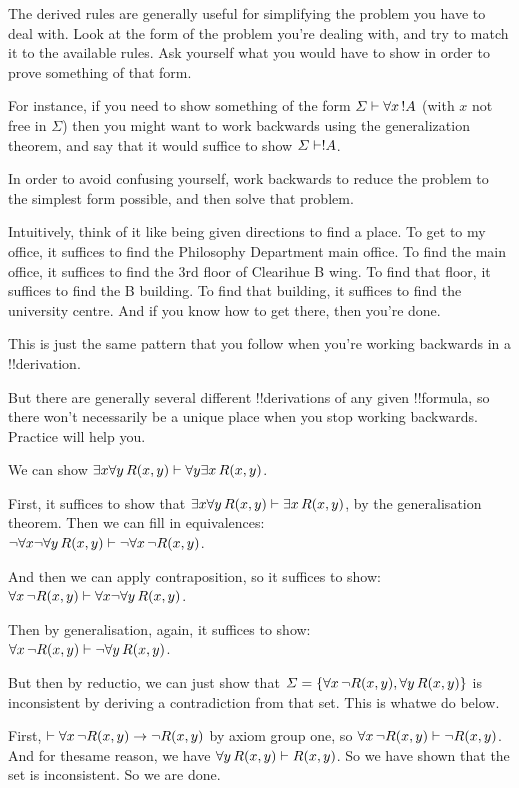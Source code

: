 \documentclass[../../../include/open-logic-section]{subfiles}
\begin{document}

\begin{explain}

    The derived rules are generally useful for simplifying the problem
    you have to deal with. Look at the form of the problem you're dealing
with, and try to match it to the available rules. Ask yourself what you
would have to show in order to prove something of that form.

    For instance, if you need to show something of the form $\Sigma
\Proves \lforall[x][!A]$ (with $x$ not free in $\Sigma$) then you might
want to work backwards using the generalization theorem, and say that
    it would suffice to show $\Sigma \Proves !A$.

    In order to avoid confusing yourself, work backwards to reduce the
    problem to the simplest form possible, and then solve that problem.

    Intuitively, think of it like being given directions to find a place.
To get to my office, it suffices to find the Philosophy Department main
office. To find the main office, it suffices to find the 3rd floor of
    Clearihue B wing. To find that floor, it suffices to find the B
    building. To find that building, it suffices to find the university
    centre. And if you know how to get there, then you're done.

    This is just the same pattern that you follow when you're working
    backwards in a !!{derivation}.

    But there are generally several different !!{derivation}s of any given
    !!{formula}, so there won't necessarily be a unique place when you stop
    working backwards. Practice will help you.
\end{explain}

\begin{ex}
We can show $\lexists[x]\lforall[y][R(x,y)] \Proves
\lforall[y]\lexists[x][R(x,y)]$.

First, it suffices to show that $\lexists[x]\lforall[y][R(x,y)] \Proves
\lexists[x][R(x,y)]$, by the generalisation theorem. Then we can fill
    in equivalences:\\
$\lnot \lforall[x] \lnot \lforall[y][R(x,y)] \Proves \lnot
\lforall[x][\lnot R(x,y)]$.

And then we can apply contraposition, so it suffices to show:\\ 
$\lforall[x][\lnot R(x,y)] \Proves \lforall[x]\lnot \lforall[y][R(x,y)]$. 

Then by generalisation, again, it suffices to show:\\
$\lforall[x][\lnot R(x,y)] \Proves \lnot \lforall[y][R(x,y)]$. 

But then by reductio, we can just show that $\Sigma = \{\lforall[x][\lnot
R(x,y)], \lforall[y][R(x,y)]
\}$ is inconsistent by deriving a contradiction from that set. This is
whatwe do below.

First, $\Proves \lforall[x][\lnot R(x,y)] \rightarrow \lnot R(x,y)$ by
axiom
group one, so $\lforall[x][\lnot R(x,y)] \Proves \lnot R(x,y)$. And for thesame
reason, we have $\lforall[y][ R(x,y)] \Proves R(x,y)$. So we have shown
that the
set is inconsistent. So we are done.
\end{ex}
\end{document}
